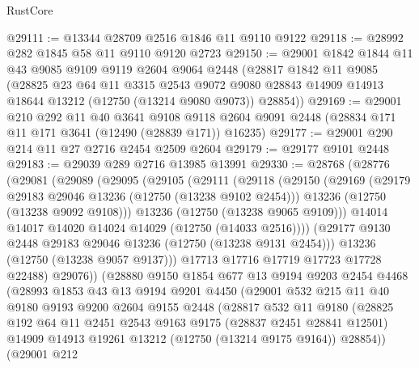 \begin{lexlean}{RustCore}
\begin{coremodule}
@29111 := @13344 @28709 @2516 @1846 @11 @9110 @9122
@29118 := @28992 @282 @1845 @58 @11 @9110 @9120 @2723
@29150 := @29001
    @1842
    @1844
    @11
    @43
    @9085
    @9109
    @9119
    @2604
    @9064
    @2448
    (@28817
      @1842
      @11
      @9085
      (@28825
        @23
        @64
        @11
        @3315
        @2543
        @9072
        @9080
        @28843
        @14909
        @14913
        @18644
        @13212
        (@12750 (@13214 @9080 @9073))
        @28854))
@29169 := @29001
    @210
    @292
    @11
    @40
    @3641
    @9108
    @9118
    @2604
    @9091
    @2448
    (@28834 @171 @11 @171 @3641 (@12490 (@28839 @171)) @16235)
@29177 := @29001 @290 @214 @11 @27 @2716 @2454 @2509 @2604
@29179 := @29177 @9101 @2448
@29183 := @29039 @289 @2716 @13985 @13991
@29330 := @28768
    (@28776
      (@29081
        (@29089
          (@29095
            (@29105
              (@29111
                (@29118
                  (@29150
                    (@29169
                      (@29179 @29183 @29046 @13236 (@12750 (@13238 @9102 @2454)))
                      @13236
                      (@12750 (@13238 @9092 @9108)))
                    @13236
                    (@12750 (@13238 @9065 @9109)))
                  @14014
                  @14017
                  @14020
                  @14024
                  @14029
                  (@12750 (@14033 @2516))))
              (@29177 @9130 @2448 @29183 @29046 @13236 (@12750 (@13238 @9131 @2454)))
              @13236
              (@12750 (@13238 @9057 @9137)))
            @17713
            @17716
            @17719
            @17723
            @17728
            @22488)
          @29076))
      (@28880
        @9150
        @1854
        @677
        @13
        @9194
        @9203
        @2454
        @4468
        (@28993
          @1853
          @43
          @13
          @9194
          @9201
          @4450
          (@29001
            @532
            @215
            @11
            @40
            @9180
            @9193
            @9200
            @2604
            @9155
            @2448
            (@28817
              @532
              @11
              @9180
              (@28825
                @192
                @64
                @11
                @2451
                @2543
                @9163
                @9175
                (@28837 @2451 @28841 @12501)
                @14909
                @14913
                @19261
                @13212
                (@12750 (@13214 @9175 @9164))
                @28854))
            (@29001
              @212

\end{coremodule}
\end{lexlean}
